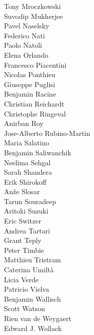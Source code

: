 \documentclass[PICOReport.tex]{subfiles}
\begin{document}
{\begin{multicols}{4}
Tony Mroczkowski                \\
Suvodip Mukherjee               \\
Pavel Naselsky                  \\
Federico Nati                   \\
Paolo Natoli                    \\
Elena Orlando                   \\
Francesco Piacentini            \\
Nicolas Ponthieu                \\
Giuseppe Puglisi                \\
Benjamin Racine                 \\
Christian Reichardt             \\
Christophe Ringeval             \\
Anirban Roy                     \\
Jose-Alberto Rubino-Martin      \\
Maria Salatino                  \\
Benjamin Saliwanchik            \\
Neelima Sehgal                  \\
Sarah Shandera                  \\
Erik Shirokoff                  \\
An\v{z}e Slosar                 \\
Tarun Souradeep                 \\
Aritoki Suzuki                  \\
Eric Switzer                    \\
Andrea Tartari                  \\
Grant Teply                     \\
Peter Timbie                    \\
Matthieu Tristram               \\
Caterina Umilt\`{a}             \\
Licia Verde                     \\
Patricio Vielva                 \\
Benjamin Wallisch               \\
Scott Watson                    \\
Rien van de Weygaert            \\
Edward J. Wollack               
\end{multicols}
}
\end{document}

